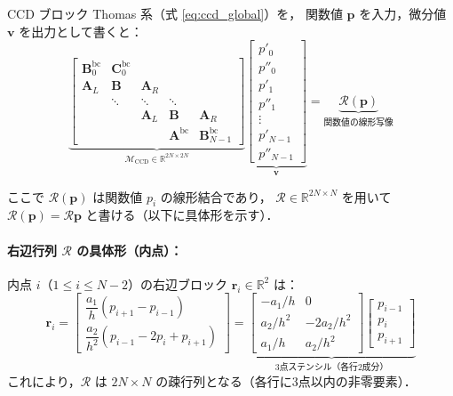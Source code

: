 CCD ブロック Thomas 系（式 \eqref{eq:ccd_global}）を，
関数値 $\bm{p}$ を入力，微分値 $\bm{v}$ を出力として書くと：
\begin{equation}
  \underbrace{
  \begin{bmatrix}
    \mathbf{B}_0^{\mathrm{bc}} & \mathbf{C}_0^{\mathrm{bc}} & & \\
    \mathbf{A}_L & \mathbf{B} & \mathbf{A}_R & \\
    & \ddots & \ddots & \ddots \\
    & & \mathbf{A}_L & \mathbf{B} & \mathbf{A}_R \\
    & & & \mathbf{A}^{\mathrm{bc}} & \mathbf{B}_{N-1}^{\mathrm{bc}}
  \end{bmatrix}
  }_{\mathcal{M}_{\mathrm{CCD}} \in \mathbb{R}^{2N \times 2N}}
  \underbrace{
  \begin{bmatrix} p'_0 \\ p''_0 \\ p'_1 \\ p''_1 \\ \vdots \\ p'_{N-1} \\ p''_{N-1} \end{bmatrix}
  }_{\bm{v}}
  =
  \underbrace{
  \mathcal{R}(\bm{p})
  }_{\text{関数値の線形写像}}
  \label{eq:ccd_matrix_full}
\end{equation}

ここで $\mathcal{R}(\bm{p})$ は関数値 $p_i$ の線形結合であり，
$\mathcal{R} \in \mathbb{R}^{2N \times N}$ を用いて $\mathcal{R}(\bm{p}) = \mathcal{R}\bm{p}$
と書ける（以下に具体形を示す）．

\paragraph{右辺行列 $\mathcal{R}$ の具体形（内点）：}

内点 $i$（$1 \le i \le N-2$）の右辺ブロック $\mathbf{r}_i \in \mathbb{R}^2$ は：
\begin{equation}
  \mathbf{r}_i =
  \begin{bmatrix}
    \dfrac{a_1}{h}(p_{i+1} - p_{i-1}) \\[8pt]
    \dfrac{a_2}{h^2}(p_{i-1} - 2p_i + p_{i+1})
  \end{bmatrix}
  =
  \underbrace{\begin{bmatrix} -a_1/h & 0 \\ a_2/h^2 & -2a_2/h^2 \\ a_1/h & a_2/h^2 \end{bmatrix}
  \begin{bmatrix} p_{i-1} \\ p_i \\ p_{i+1} \end{bmatrix}
  }_{\text{3点ステンシル（各行2成分）}}
  \label{eq:rhs_block}
\end{equation}
これにより，$\mathcal{R}$ は $2N \times N$ の疎行列となる（各行に3点以内の非零要素）．

